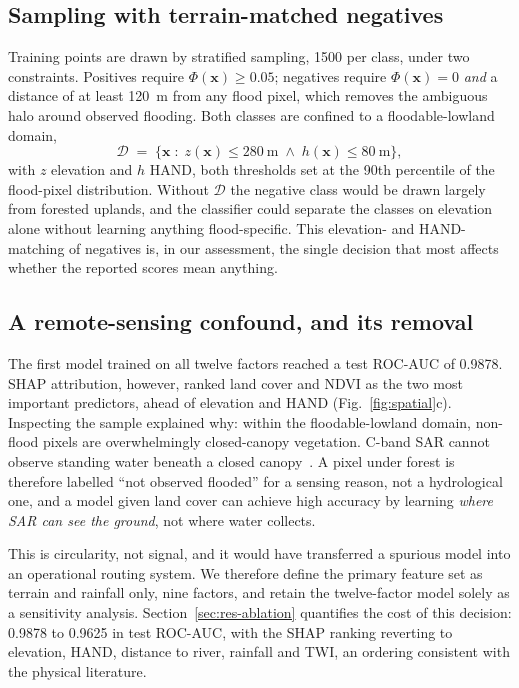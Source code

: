 \documentclass[10pt,twocolumn]{article}
\begin{document}
\subsection{Sampling with terrain-matched negatives}
Training points are drawn by stratified sampling, \num{1500} per class, under two
constraints. Positives require $\Phi(\mathbf{x})\ge 0.05$; negatives require
$\Phi(\mathbf{x})=0$ \emph{and} a distance of at least \SI{120}{\metre} from any
flood pixel, which removes the ambiguous halo around observed flooding. Both
classes are confined to a floodable-lowland domain,
\begin{equation}
\mathcal{D} \;=\; \bigl\{\mathbf{x} \;:\; z(\mathbf{x}) \le \SI{280}{\metre}
\;\wedge\; h(\mathbf{x}) \le \SI{80}{\metre}\bigr\},
\label{eq:domain}
\end{equation}
with $z$ elevation and $h$ HAND, both thresholds set at the 90th percentile of
the flood-pixel distribution. Without $\mathcal{D}$ the negative class would be
drawn largely from forested uplands, and the classifier could separate the
classes on elevation alone without learning anything flood-specific. This
elevation- and HAND-matching of negatives is, in our assessment, the single
decision that most affects whether the reported scores mean anything.

\subsection{A remote-sensing confound, and its removal}
\label{sec:method-confound}
The first model trained on all twelve factors reached a test ROC-AUC of 0.9878.
SHAP attribution, however, ranked land cover and NDVI as the two most important
predictors, ahead of elevation and HAND (Fig.~\ref{fig:spatial}c). Inspecting
the sample explained why: within the floodable-lowland domain, non-flood pixels
are overwhelmingly closed-canopy vegetation. C-band SAR cannot observe standing
water beneath a closed canopy~\citep{townsend2002,tsyganskaya2018}. A pixel under
forest is therefore labelled ``not observed flooded'' for a sensing reason, not a
hydrological one, and a model given land cover can achieve high accuracy by
learning \emph{where SAR can see the ground}, not where water collects.

This is circularity, not signal, and it would have transferred a spurious model
into an operational routing system. We therefore define the primary feature set
as terrain and rainfall only, nine factors, and retain the twelve-factor model
solely as a sensitivity analysis. Section~\ref{sec:res-ablation} quantifies the
cost of this decision: 0.9878 to 0.9625 in test ROC-AUC, with the SHAP ranking
reverting to elevation, HAND, distance to river, rainfall and TWI, an ordering
consistent with the physical literature.
\end{document}
